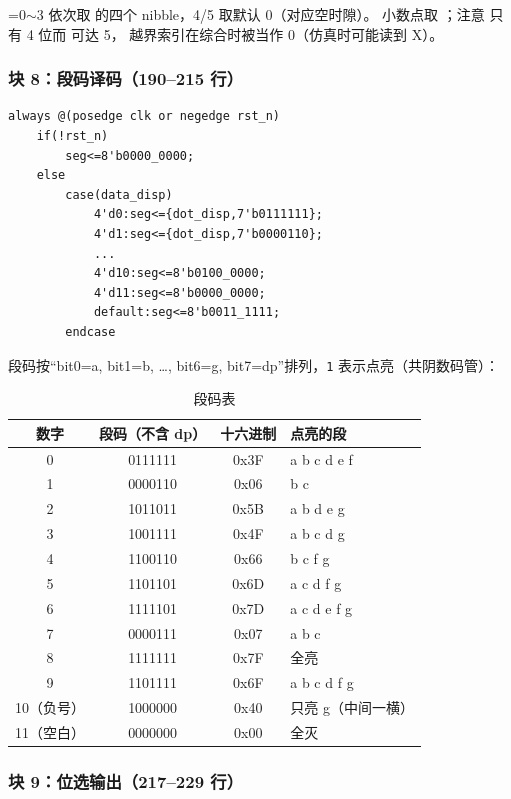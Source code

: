=0$\sim$3 依次取  的四个 nibble，4/5 取默认 0（对应空时隙）。
小数点取 ；注意  只有 4 位而  可达 5，
越界索引在综合时被当作 0（仿真时可能读到 X）。

\subsubsection{块 8：段码译码（190--215 行）}

\begin{lstlisting}[style=vsnip]
always @(posedge clk or negedge rst_n)
    if(!rst_n)
        seg<=8'b0000_0000;
    else
        case(data_disp)
            4'd0:seg<={dot_disp,7'b0111111};
            4'd1:seg<={dot_disp,7'b0000110};
            ...
            4'd10:seg<=8'b0100_0000;
            4'd11:seg<=8'b0000_0000;
            default:seg<=8'b0011_1111;
        endcase
\end{lstlisting}

段码按“bit0=a, bit1=b, …, bit6=g, bit7=dp”排列，\texttt{1} 表示点亮（共阴数码管）：

\begin{table}[htbp]
\centering
\small
\caption{段码表}
\begin{tabular}{cccl}
\toprule
数字 & 段码（不含 dp） & 十六进制 & 点亮的段\\
\midrule
0 & 0111111 & 0x3F & a b c d e f\\
1 & 0000110 & 0x06 & b c\\
2 & 1011011 & 0x5B & a b d e g\\
3 & 1001111 & 0x4F & a b c d g\\
4 & 1100110 & 0x66 & b c f g\\
5 & 1101101 & 0x6D & a c d f g\\
6 & 1111101 & 0x7D & a c d e f g\\
7 & 0000111 & 0x07 & a b c\\
8 & 1111111 & 0x7F & 全亮\\
9 & 1101111 & 0x6F & a b c d f g\\
10（负号） & 1000000 & 0x40 & 只亮 g（中间一横）\\
11（空白） & 0000000 & 0x00 & 全灭\\
\bottomrule
\end{tabular}
\end{table}

\subsubsection{块 9：位选输出（217--229 行）}

